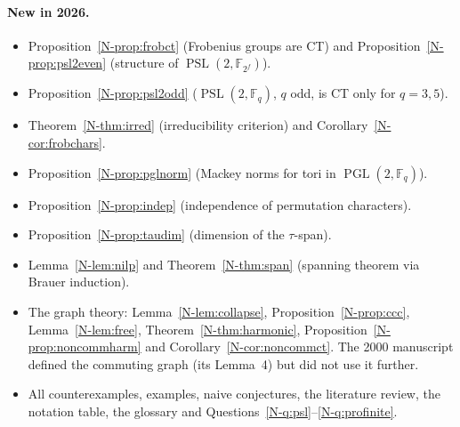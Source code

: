\documentclass[12pt,letterpaper]{article}
\newcommand{\F}{\mathbb{F}}
\DeclareMathOperator{\PGL}{PGL}
\DeclareMathOperator{\PSL}{PSL}
\begin{document}
\paragraph{New in 2026.}
\begin{itemize}[itemsep=1pt]
\item Proposition~\ref{N-prop:frobct} (Frobenius groups are CT) and
  Proposition~\ref{N-prop:psl2even} (structure of $\PSL(2,\F_{2^f})$).
\item Proposition~\ref{N-prop:psl2odd} ($\PSL(2,\F_q)$, $q$ odd, is CT only
  for $q=3,5$).
\item Theorem~\ref{N-thm:irred} (irreducibility criterion) and
  Corollary~\ref{N-cor:frobchars}.
\item Proposition~\ref{N-prop:pglnorm} (Mackey norms for tori in
  $\PGL(2,\F_q)$).
\item Proposition~\ref{N-prop:indep} (independence of permutation
  characters).
\item Proposition~\ref{N-prop:taudim} (dimension of the $\tau$-span).
\item Lemma~\ref{N-lem:nilp} and Theorem~\ref{N-thm:span} (spanning theorem
  via Brauer induction).
\item The graph theory: Lemma~\ref{N-lem:collapse},
  Proposition~\ref{N-prop:ccc}, Lemma~\ref{N-lem:free},
  Theorem~\ref{N-thm:harmonic}, Proposition~\ref{N-prop:noncommharm} and
  Corollary~\ref{N-cor:noncommct}. The 2000 manuscript defined the commuting
  graph (its Lemma~4) but did not use it further.
\item All counterexamples, examples, naive conjectures, the literature
  review, the notation table, the glossary and
  Questions~\ref{N-q:psl}--\ref{N-q:profinite}.
\end{itemize}
\end{document}
